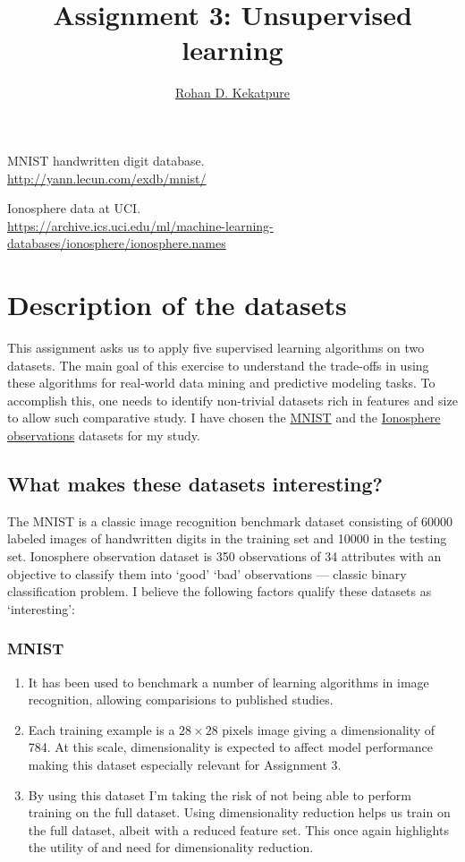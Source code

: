\documentclass[10pt,letterpaper]{article}
\begin{document}
\title{\Large{Assignment 3: Unsupervised learning}}
\author{\href{mailto:rohan.kekatpure@gmail.com}{Rohan D. Kekatpure}}
\address{}
\email{}

\begin{thebibliography}{9}
MNIST handwritten digit database.\\
\href{\tt http://yann.lecun.com/exdb/mnist/}{http://yann.lecun.com/exdb/mnist/}

Ionosphere data at UCI.\\
\href{\tt https://archive.ics.uci.edu/ml/machine-learning-databases/ionosphere/ionosphere.names}{https://archive.ics.uci.edu/ml/machine-learning-databases/ionosphere/ionosphere.names}
\end{thebibliography}

\section{Description of the datasets}
This assignment asks us to apply five supervised learning algorithms on two datasets. The main goal of this exercise to understand the trade-offs in using these algorithms for real-world data mining and predictive modeling tasks. To accomplish this, one needs to identify non-trivial datasets rich in features and size to allow such comparative study. I have chosen the \href{http://yann.lecun.com/exdb/mnist/}{MNIST} \cite{mnist} and the \href{Its a binary classification problem allowing an easier comparative analysis of various learning algorithms.}{Ionosphere observations} \cite{ionosphere} datasets for my study. 

\subsection{What makes these datasets interesting?} 
The MNIST is a classic image recognition benchmark dataset consisting of 60000 labeled images of handwritten digits in the training set and 10000 in the testing set. Ionosphere observation dataset is 350 observations of 34 attributes with an objective to classify them into `good' `bad' observations --- classic binary classification problem. I believe the following factors qualify these datasets as `interesting':
\subsubsection*{MNIST}
\begin{enumerate}
	\item It has been used to benchmark a number of learning algorithms in image recognition, allowing comparisions to published studies.
	\item Each training example is a $28\times28$ pixels image giving a dimensionality of 784. At this scale, dimensionality is expected to affect model performance making this dataset especially relevant for Assignment 3. 
	\item By using this dataset I'm taking the risk of not being able to perform training on the full dataset. Using dimensionality reduction helps us train on the full dataset, albeit with a reduced feature set. This once again highlights the utility of and need for dimensionality reduction.
\end{enumerate}
\end{document}

